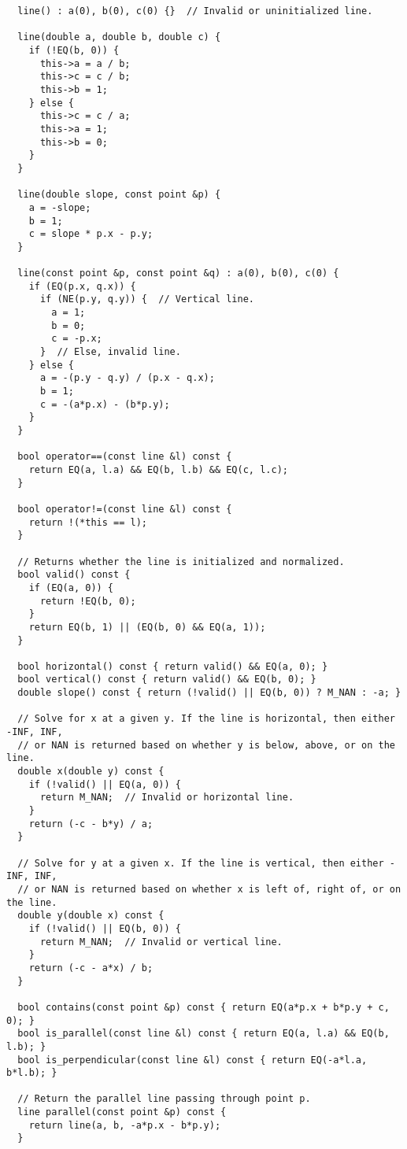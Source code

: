 \begin{lstlisting}
  line() : a(0), b(0), c(0) {}  // Invalid or uninitialized line.

  line(double a, double b, double c) {
    if (!EQ(b, 0)) {
      this->a = a / b;
      this->c = c / b;
      this->b = 1;
    } else {
      this->c = c / a;
      this->a = 1;
      this->b = 0;
    }
  }

  line(double slope, const point &p) {
    a = -slope;
    b = 1;
    c = slope * p.x - p.y;
  }

  line(const point &p, const point &q) : a(0), b(0), c(0) {
    if (EQ(p.x, q.x)) {
      if (NE(p.y, q.y)) {  // Vertical line.
        a = 1;
        b = 0;
        c = -p.x;
      }  // Else, invalid line.
    } else {
      a = -(p.y - q.y) / (p.x - q.x);
      b = 1;
      c = -(a*p.x) - (b*p.y);
    }
  }

  bool operator==(const line &l) const {
    return EQ(a, l.a) && EQ(b, l.b) && EQ(c, l.c);
  }

  bool operator!=(const line &l) const {
    return !(*this == l);
  }

  // Returns whether the line is initialized and normalized.
  bool valid() const {
    if (EQ(a, 0)) {
      return !EQ(b, 0);
    }
    return EQ(b, 1) || (EQ(b, 0) && EQ(a, 1));
  }

  bool horizontal() const { return valid() && EQ(a, 0); }
  bool vertical() const { return valid() && EQ(b, 0); }
  double slope() const { return (!valid() || EQ(b, 0)) ? M_NAN : -a; }

  // Solve for x at a given y. If the line is horizontal, then either -INF, INF,
  // or NAN is returned based on whether y is below, above, or on the line.
  double x(double y) const {
    if (!valid() || EQ(a, 0)) {
      return M_NAN;  // Invalid or horizontal line.
    }
    return (-c - b*y) / a;
  }

  // Solve for y at a given x. If the line is vertical, then either -INF, INF,
  // or NAN is returned based on whether x is left of, right of, or on the line.
  double y(double x) const {
    if (!valid() || EQ(b, 0)) {
      return M_NAN;  // Invalid or vertical line.
    }
    return (-c - a*x) / b;
  }

  bool contains(const point &p) const { return EQ(a*p.x + b*p.y + c, 0); }
  bool is_parallel(const line &l) const { return EQ(a, l.a) && EQ(b, l.b); }
  bool is_perpendicular(const line &l) const { return EQ(-a*l.a, b*l.b); }

  // Return the parallel line passing through point p.
  line parallel(const point &p) const {
    return line(a, b, -a*p.x - b*p.y);
  }


\end{lstlisting}
